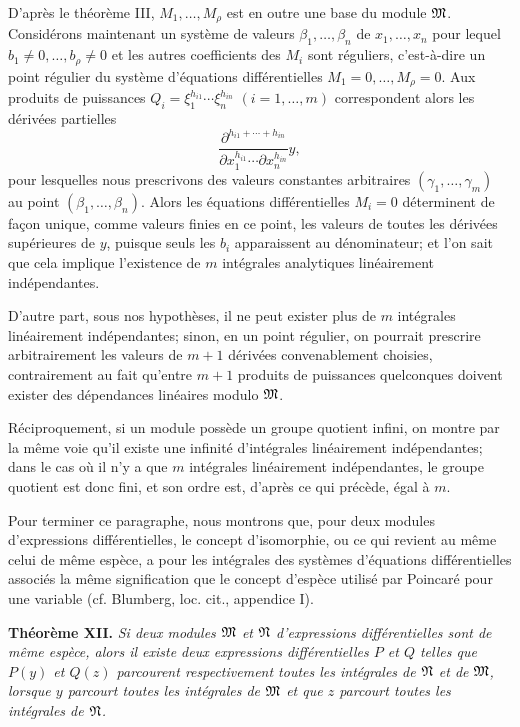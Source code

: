 D'après le théorème III, $M_1,\ldots,M_\rho$ est en outre une base du module $\mathfrak{M}$. Considérons maintenant un système de valeurs $\beta_1,\ldots,\beta_n$ de $x_1,\ldots,x_n$ pour lequel $b_1\ne0,\ldots,b_\rho\ne0$ et les autres coefficients des $M_i$ sont réguliers, c'est-à-dire un point régulier du système d'équations différentielles $M_1=0,\ldots,M_\rho=0$. Aux produits de puissances $Q_i=\xi_1^{h_{i1}}\cdots\xi_n^{h_{in}}$ $(i=1,\ldots,m)$ correspondent alors les dérivées partielles
\[
 \frac{\partial^{h_{i1}+\cdots+h_{in}}}{\partial x_1^{h_{i1}}\cdots\partial x_n^{h_{in}}}y,
\]
pour lesquelles nous prescrivons des valeurs constantes arbitraires $(\gamma_1,\ldots,\gamma_m)$ au point $(\beta_1,\ldots,\beta_n)$. Alors les équations différentielles $M_i=0$ déterminent de façon unique, comme valeurs finies en ce point, les valeurs de toutes les dérivées supérieures de $y$, puisque seuls les $b_i$ apparaissent au dénominateur; et l'on sait que cela implique l'existence de $m$ intégrales analytiques linéairement indépendantes.

D'autre part, sous nos hypothèses, il ne peut exister plus de $m$ intégrales linéairement indépendantes; sinon, en un point régulier, on pourrait prescrire arbitrairement les valeurs de $m+1$ dérivées convenablement choisies, contrairement au fait qu'entre $m+1$ produits de puissances quelconques doivent exister des dépendances linéaires modulo $\mathfrak{M}$.

Réciproquement, si un module possède un groupe quotient infini, on montre par la même voie qu'il existe une infinité d'intégrales linéairement indépendantes; dans le cas où il n'y a que $m$ intégrales linéairement indépendantes, le groupe quotient est donc fini, et son ordre est, d'après ce qui précède, égal à $m$.

Pour terminer ce paragraphe, nous montrons que, pour deux modules d'expressions différentielles, le concept d'isomorphie, ou ce qui revient au même celui de même espèce, a pour les intégrales des systèmes d'équations différentielles associés la même signification que le concept d'espèce utilisé par Poincaré pour une variable (cf. Blumberg, loc. cit., appendice I).

\textbf{Théorème XII.} \emph{Si deux modules $\mathfrak{M}$ et $\mathfrak{N}$ d'expressions différentielles sont de même espèce, alors il existe deux expressions différentielles $P$ et $Q$ telles que $P(y)$ et $Q(z)$ parcourent respectivement toutes les intégrales de $\mathfrak{N}$ et de $\mathfrak{M}$, lorsque $y$ parcourt toutes les intégrales de $\mathfrak{M}$ et que $z$ parcourt toutes les intégrales de $\mathfrak{N}$.}

